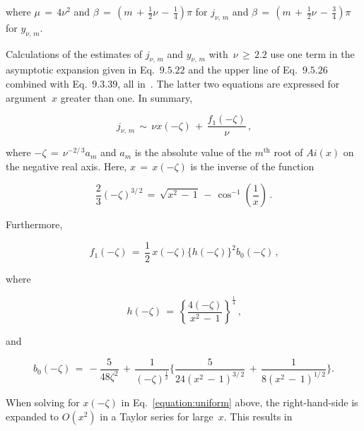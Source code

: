 \documentclass{article}[10pt]
\begin{document}
\noindent
where $\mu\,=\,4\nu^2$
and $\beta\,=\,\left(m\,+\,\frac{1}{2}\nu\,-\,\frac{1}{4}\right)\pi$
for $j_{\nu,\,m}$
and $\beta\,=\,\left(m\,+\,\frac{1}{2}\nu\,-\,\frac{3}{4}\right)\pi$
for $y_{\nu,\,m}$.

\vspace{2pt}

Calculations of the estimates of $j_{\nu,\,m}$ and $y_{\nu,\,m}$
with~$\nu\,\ge\,2.2$ use
one term in the asymptotic expansion given in
Eq.~$9$.$5$.$22$ and the upper line of Eq.~$9$.$5$.$26$
combined with Eq.~$9$.$3$.$39$, all in~\cite{bibitem:abramowitz}.
The latter two equations are expressed for
argument~$x$ greater than one. In summary,

\begin{equation}
j_{\nu,\,m}
\,\sim\,
\nu x(-\zeta)
\,+\,
\dfrac{f_{1}(-\zeta)}{\nu}
\,{\text{,}}
\end{equation}

\noindent
where $-\zeta\,=\,\nu^{-2/\,3}a_{m}$ and $a_{m}$ is
the absolute value of the $m^{\text{th}}$ root
of $Ai(x)$ on the negative real axis.
Here, $x\,=\,x(-\zeta)$ is the inverse of the function

\begin{equation}
\dfrac{2}{3}
(-\zeta)^{3/\,2}
\,=\,
\sqrt{x^{2}\,-\,1}
\,-\,
\cos^{-1}\left(\dfrac{1}{x}\right)
\,{\text{.}}
\label{equation:uniform}
\end{equation}

\noindent
Furthermore,

\begin{equation}
f_1(-\zeta)
\,=\,
\dfrac{1}{2}\,
x(-\zeta)
\bigl\{h(-\zeta)\bigr\}^{2}
b_{0}(-\zeta)\,
{\text{,}}
\end{equation}

\noindent
where

\begin{equation}
h(-\zeta)
\,=\,
\left\{
\dfrac{4(-\zeta)}{x^2\,-\,1}
\right\}^{\frac{1}{4}}\,
{\text{,}}
\end{equation}

\noindent
and

\begin{equation}
b_{0}(-\zeta)
\,=\,
-\dfrac{5}{48\zeta^{2}}
\,+\,
\dfrac{1}{(-\zeta)^{\frac{1}{2}}}
\Biggl\{
\dfrac{5}{24(x^{2}\,-\,1)^{3/\,2}}
\,+\,
\dfrac{1}{8(x^{2}\,-\,1)^{1/\,2}}
\Biggr\}
{\text{.}}
\end{equation}

When solving for $x(-\zeta)$ in Eq.~\ref{equation:uniform} above,
the right-hand-side is expanded to $O(x^{2})$ in
a Taylor series for large~$x$. This results in
\end{document}
